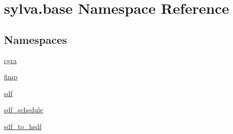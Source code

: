 \hypertarget{namespacesylva_1_1base}{}\section{sylva.\+base Namespace Reference}
\label{namespacesylva_1_1base}
\subsection*{Namespaces}
\begin{DoxyCompactItemize}
\item 
 \hyperlink{namespacesylva_1_1base_1_1cgra}{cgra}
\item 
 \hyperlink{namespacesylva_1_1base_1_1fimp}{fimp}
\item 
 \hyperlink{namespacesylva_1_1base_1_1sdf}{sdf}
\item 
 \hyperlink{namespacesylva_1_1base_1_1sdf__schedule}{sdf\+\_\+schedule}
\item 
 \hyperlink{namespacesylva_1_1base_1_1sdf__to__hsdf}{sdf\+\_\+to\+\_\+hsdf}
\end{DoxyCompactItemize}
